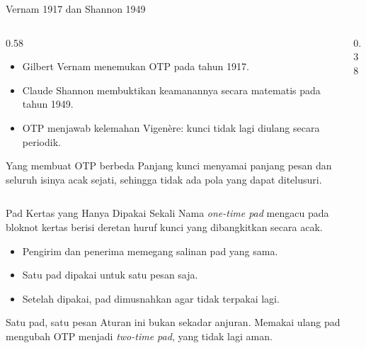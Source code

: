 \documentclass[aspectratio=169,11pt]{beamer}
\begin{document}
\begin{frame}{Vernam 1917 dan Shannon 1949}
    \begin{columns}[T,onlytextwidth]
        \begin{column}{0.58\textwidth}
            \footnotesize
            \begin{itemize}
                \item Gilbert Vernam menemukan OTP pada tahun 1917.
                \item Claude Shannon membuktikan keamanannya secara
                      matematis pada tahun 1949.
                \item OTP menjawab kelemahan Vigen\`ere: kunci tidak lagi
                      diulang secara periodik.
            \end{itemize}
            \vspace{0.1cm}
            \begin{exampleblock}{Yang membuat OTP berbeda}
                Panjang kunci menyamai panjang pesan dan seluruh isinya acak
                sejati, sehingga tidak ada pola yang dapat ditelusuri.
            \end{exampleblock}
        \end{column}
        \begin{column}{0.38\textwidth}
            \centering
        \end{column}
    \end{columns}
\end{frame}

\begin{frame}{Pad Kertas yang Hanya Dipakai Sekali}
    \footnotesize
    Nama \emph{one-time pad} mengacu pada bloknot kertas berisi deretan
    huruf kunci yang dibangkitkan secara acak.
    \begin{itemize}
        \item Pengirim dan penerima memegang salinan pad yang sama.
        \item Satu pad dipakai untuk satu pesan saja.
        \item Setelah dipakai, pad dimusnahkan agar tidak terpakai lagi.
    \end{itemize}
    \vspace{0.2cm}
    \begin{alertblock}{Satu pad, satu pesan}
        Aturan ini bukan sekadar anjuran. Memakai ulang pad mengubah OTP
        menjadi \emph{two-time pad}, yang tidak lagi aman.
    \end{alertblock}
\end{frame}
\end{document}

